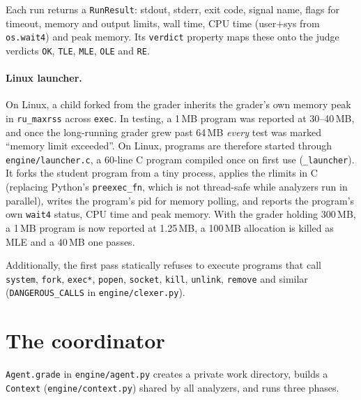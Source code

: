 \documentclass[11pt,a4paper]{article}
\newcommand{\file}[1]{\nolinkurl{#1}}
\newcommand{\fn}[1]{\nolinkurl{#1}}
\begin{document}
Each run returns a \fn{RunResult}: stdout, stderr, exit code, signal name, flags for timeout, memory and
output limits, wall time, CPU time (user+sys from \fn{os.wait4}) and peak memory. Its \fn{verdict} property
maps these onto the judge verdicts \texttt{OK}, \texttt{TLE}, \texttt{MLE}, \texttt{OLE} and \texttt{RE}.

\paragraph{Linux launcher.} On Linux, a child forked from the grader inherits the grader's own memory peak in
\texttt{ru\_maxrss} across \texttt{exec}. In testing, a 1\,MB program was reported at 30--40\,MB, and once the
long-running grader grew past 64\,MB \emph{every} test was marked ``memory limit exceeded''. On Linux, programs
are therefore started through \file{engine/launcher.c}, a 60-line C program compiled once on first use
(\fn{_launcher}). It forks the student program from a tiny process, applies the rlimits in C (replacing Python's
\fn{preexec_fn}, which is not thread-safe while analyzers run in parallel), writes the program's pid for memory
polling, and reports the program's own \fn{wait4} status, CPU time and peak memory. With the grader holding
300\,MB, a 1\,MB program is now reported at 1.25\,MB, a 100\,MB allocation is killed as MLE and a 40\,MB one passes.

Additionally, the first pass statically refuses to execute programs that call \texttt{system},
\texttt{fork}, \texttt{exec*}, \texttt{popen}, \texttt{socket}, \texttt{kill}, \texttt{unlink}, \texttt{remove} and similar
(\texttt{DANGEROUS\_CALLS} in \file{engine/clexer.py}).

\section{The coordinator}
\fn{Agent.grade} in \file{engine/agent.py} creates a private work directory, builds a \fn{Context}
(\file{engine/context.py}) shared by all analyzers, and runs three phases.
\end{document}
